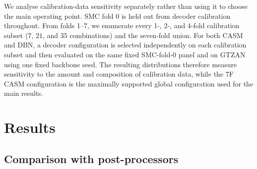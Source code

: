 \documentclass{article}
\begin{document}
We analyse calibration-data sensitivity separately rather than using it to choose the main operating point. SMC fold 0 is held out from decoder calibration throughout. From folds 1--7, we enumerate every 1-, 2-, and 4-fold calibration subset ($7$, $21$, and $35$ combinations) and the seven-fold union. For both CASM and DBN, a decoder configuration is selected independently on each calibration subset and then evaluated on the same fixed SMC-fold-0 panel and on GTZAN using one fixed backbone seed. The resulting distributions therefore measure sensitivity to the amount and composition of calibration data, while the 7F CASM configuration is the maximally supported global configuration used for the main results.
\section{Results}
\label{sec:results}

\subsection{Comparison with post-processors}
\end{document}
